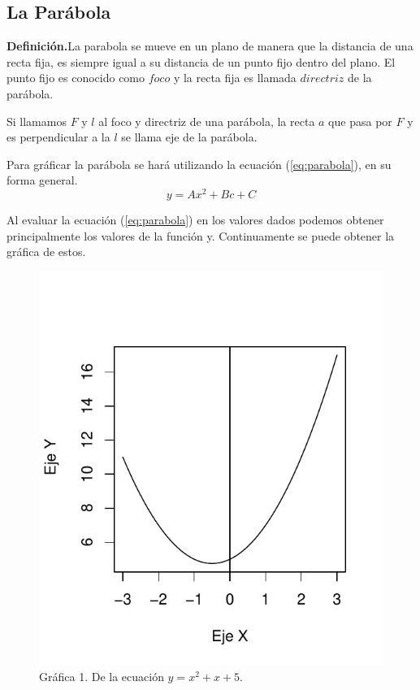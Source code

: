 \documentclass[12pt,a4paper]{report}
\begin{document}
\newpage
\subsection{La Parábola} \label{subsec:parabola}
\textbf{Definición.}La parabola se mueve en un plano de manera que la distancia de una recta fija, es siempre igual a su distancia de un punto fijo dentro del plano.
El punto fijo es conocido como $foco$  y la recta fija es llamada $directriz$ de la parábola. 


Si llamamos $F$ y $l$ al foco y directriz de una parábola, la recta $a$ que pasa por $F$ y es perpendicular a la $l$ se llama eje de la parábola.

Para gráficar la parábola se hará utilizando la ecuación (\ref{eq:parabola}), en su forma general.
\begin{equation}
y = Ax^2 + Bc + C \label{eq:parabola}
\end{equation}

Al evaluar la ecuación (\ref{eq:parabola}) en los valores dados podemos obtener principalmente los valores de la función y. Continuamente se puede obtener la gráfica de estos. 


\begin{figure}
\centering
\includegraphics[scale=0.8]{Parabola1}
\caption{Gráfica 1. De la ecuación $y = x ^2 + x + 5$.}
\label{fig:Parabola1}
\end{figure}
\end{document}
